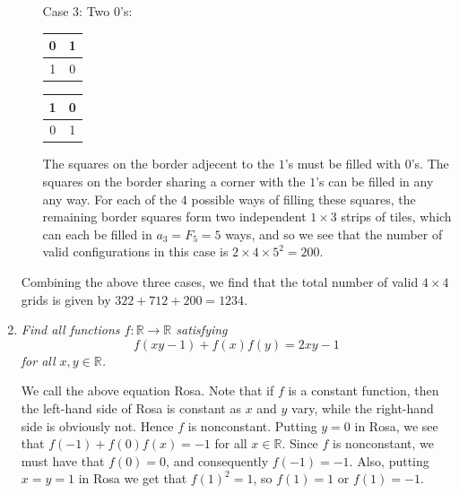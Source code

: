 \documentclass[a4paper,12pt]{article}
\newcommand{\grid}[4]{ %
    \begin{tabular}{|c|c|} %
        \hline %
        #1 & #2 \\
        \hline %
        #3 & #4 \\
        \hline %
    \end{tabular} %
}
\begin{document}
\begin{enumerate}
\begin{enumerate}
    \item[Case 3:] Two $0$'s: \grid{0}{1}{1}{0} \grid{1}{0}{0}{1}

        The squares on the border adjecent to the $1$'s must be filled with
        $0$'s. The squares on the border sharing a corner with the $1$'s can be
        filled in any any way. For each of the $4$ possible ways of filling
        these squares, the remaining border squares form two independent $1
        \times 3$ strips of tiles, which can each be filled in $a_3 = F_5 =
        5$ ways, and so we see that the number of valid
        configurations in this case is $2 \times 4 \times 5^2 = 200$.

\end{enumerate}

Combining the above three cases, we find that the total number of valid $4
\times 4$ grids is given by $322 + 712 + 200 = 1234$.

	\item 
	\textit{Find all functions $f:\mathbb{R} \rightarrow \mathbb{R}$ satisfying $$f(xy-1)+f(x)f(y) = 2xy - 1$$ for all $x,y \in \mathbb{R}$.}
	
	We call the above equation Rosa. Note that if $f$ is a constant function, then the left-hand side of Rosa is constant as $x$ and $y$ vary, while the right-hand side is obviously not. Hence $f$ is nonconstant. Putting $y=0$ in Rosa, we see that $f(-1) +f(0)f(x) = -1$ for all $x\in\mathbb{R}$. Since $f$ is nonconstant, we must have that $f(0)=0$, and consequently $f(-1) = -1$. Also, putting $x=y=1$ in Rosa we get that $f(1)^2 = 1$, so $f(1) = 1$ or $f(1) = -1$.
	

\end{enumerate}
\end{document}

